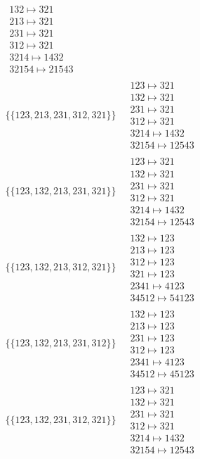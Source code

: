 \begin{scriptsize}
\begin{align}
\begin{matrix}
132 \mapsto 321\\213 \mapsto 321\\231 \mapsto 321\\312 \mapsto 321\\3214 \mapsto 1432\\32154 \mapsto 21543
\end{matrix}
\\
\{\{123, 213, 231, 312, 321\}\}
\ 
&
\begin{matrix}
123 \mapsto 321\\132 \mapsto 321\\231 \mapsto 321\\312 \mapsto 321\\3214 \mapsto 1432\\32154 \mapsto 12543
\end{matrix}
\\
\{\{123, 132, 213, 231, 321\}\}
\ 
&
\begin{matrix}
123 \mapsto 321\\132 \mapsto 321\\231 \mapsto 321\\312 \mapsto 321\\3214 \mapsto 1432\\32154 \mapsto 12543
\end{matrix}
\\
\{\{123, 132, 213, 312, 321\}\}
\ 
&
\begin{matrix}
132 \mapsto 123\\213 \mapsto 123\\312 \mapsto 123\\321 \mapsto 123\\2341 \mapsto 4123\\34512 \mapsto 54123
\end{matrix}
\\
\{\{123, 132, 213, 231, 312\}\}
\ 
&
\begin{matrix}
132 \mapsto 123\\213 \mapsto 123\\231 \mapsto 123\\312 \mapsto 123\\2341 \mapsto 4123\\34512 \mapsto 45123
\end{matrix}
\\
\{\{123, 132, 231, 312, 321\}\}
\ 
&
\begin{matrix}
123 \mapsto 321\\132 \mapsto 321\\231 \mapsto 321\\312 \mapsto 321\\3214 \mapsto 1432\\32154 \mapsto 12543

\end{matrix}
\end{align}
\end{scriptsize}
